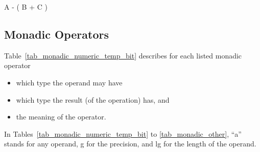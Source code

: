 A - ( B + C )

\subsection{Monadic Operators}   %

Table~\ref{tab_monadic_numeric_temp_bit}
 describes for each listed monadic operator
\begin{itemize}
\item which type the operand may have
\item which type the result (of the operation) has, and
\item the meaning of the operator.
\end{itemize}
In Tables~\ref{tab_monadic_numeric_temp_bit} to \ref{tab_monadic_other}, ``a'' stands for any operand, g for the precision, and lg for
the length of the operand.

